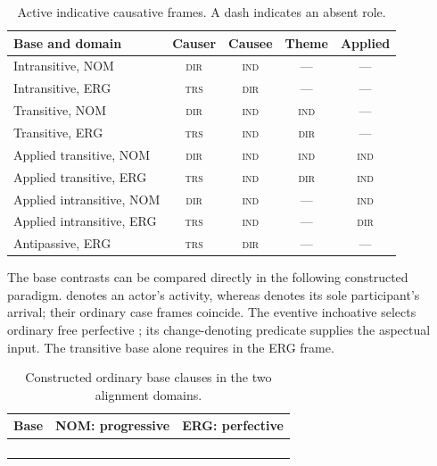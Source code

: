 \begin{table}[htbp]
\footnotesize
\caption{Active indicative causative frames. A dash indicates an absent role.}
\label{tab:causative-frames}
\begin{tabularx}{\textwidth}{L C C C C}
\toprule
Base and domain & Causer & Causee & Theme & Applied \\
\midrule
Intransitive, NOM & \textsc{dir} & \textsc{ind} & --- & --- \\
Intransitive, ERG & \textsc{trs} & \textsc{dir} & --- & --- \\
Transitive, NOM & \textsc{dir} & \textsc{ind} & \textsc{ind} & --- \\
Transitive, ERG & \textsc{trs} & \textsc{ind} & \textsc{dir} & --- \\
Applied transitive, NOM & \textsc{dir} & \textsc{ind} & \textsc{ind} & \textsc{ind} \\
Applied transitive, ERG & \textsc{trs} & \textsc{ind} & \textsc{dir} & \textsc{ind} \\
Applied intransitive, NOM & \textsc{dir} & \textsc{ind} & --- & \textsc{ind} \\
Applied intransitive, ERG & \textsc{trs} & \textsc{ind} & --- & \textsc{dir} \\
Antipassive, ERG & \textsc{trs} & \textsc{dir} & --- & --- \\
\bottomrule
\end{tabularx}
\end{table}

The base contrasts can be compared directly in the following constructed
paradigm.  denotes an actor's activity, whereas 
denotes its sole participant's arrival; their ordinary case frames coincide.
The eventive inchoative  selects ordinary free perfective
; its change-denoting predicate supplies the aspectual input.
The transitive base alone requires  in the ERG frame.

\begin{table}[htbp]
\footnotesize
\caption{Constructed ordinary base clauses in the two alignment domains.}
\label{tab:valency-base-contrasts}
\begin{tabularx}{\textwidth}{l L L}
\toprule
Base & NOM: progressive & ERG: perfective \\
\midrule
{} &  &  \\
 &  &  \\
 &  &  \\
 &  &  \\
\bottomrule
\end{tabularx}
\end{table}

